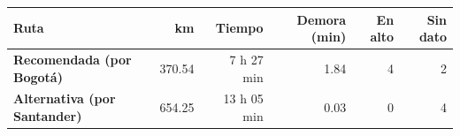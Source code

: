 \renewcommand{\arraystretch}{1.2}
\begin{tabular}{|l|r|r|r|r|r|}
\hline
\rowcolor{gray!20} \textbf{Ruta} & \textbf{km} & \textbf{Tiempo} & \textbf{Demora (min)} & \textbf{En alto} & \textbf{Sin dato} \\
\hline
\textbf{Recomendada (por Bogotá)} & 370.54 & 7 h 27 min & 1.84 & 4 & 2 \\
\hline
\textbf{Alternativa (por Santander)} & 654.25 & 13 h 05 min & 0.03 & 0 & 4 \\
\hline
\end{tabular}
